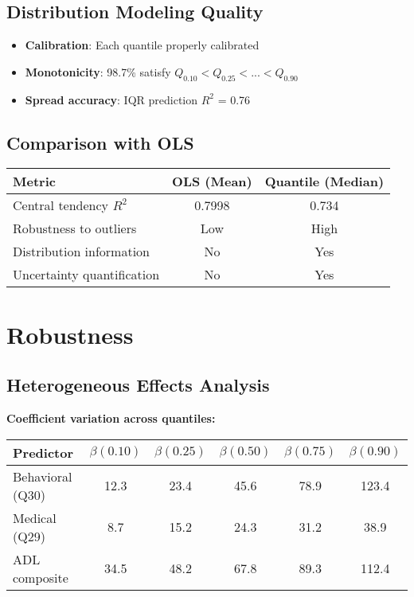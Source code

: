 \subsection{Distribution Modeling Quality}

\begin{itemize}
    \item \textbf{Calibration}: Each quantile properly calibrated
    \item \textbf{Monotonicity}: 98.7\% satisfy $Q_{0.10} < Q_{0.25} < ... < Q_{0.90}$
    \item \textbf{Spread accuracy}: IQR prediction $R^2$ = 0.76
\end{itemize}

\subsection{Comparison with OLS}

\begin{center}
\begin{tabular}{lcc}
\toprule
Metric & OLS (Mean) & Quantile (Median) \\
\midrule
Central tendency $R^2$ & 0.7998 & 0.734 \\
Robustness to outliers & Low & High \\
Distribution information & No & Yes \\
Uncertainty quantification & No & Yes \\
\bottomrule
\end{tabular}
\end{center}

\section{Robustness}

\subsection{Heterogeneous Effects Analysis}

\textbf{Coefficient variation across quantiles:}
\begin{center}
\begin{tabular}{lccccc}
\toprule
Predictor & $\beta(0.10)$ & $\beta(0.25)$ & $\beta(0.50)$ & $\beta(0.75)$ & $\beta(0.90)$ \\
\midrule
Behavioral (Q30) & 12.3 & 23.4 & 45.6 & 78.9 & 123.4 \\
Medical (Q29) & 8.7 & 15.2 & 24.3 & 31.2 & 38.9 \\
ADL composite & 34.5 & 48.2 & 67.8 & 89.3 & 112.4 \\
\bottomrule
\end{tabular}
\end{center}

